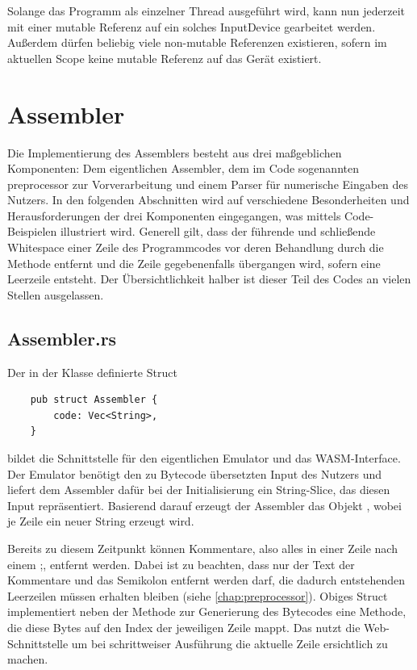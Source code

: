 
Solange das Programm als einzelner Thread ausgeführt wird, kann nun jederzeit mit einer mutable Referenz auf ein solches InputDevice gearbeitet werden. Außerdem dürfen beliebig viele non-mutable Referenzen existieren, sofern im aktuellen Scope keine mutable Referenz auf das Gerät existiert.

\section{Assembler}

Die Implementierung des Assemblers besteht aus drei maßgeblichen Komponenten: Dem eigentlichen Assembler, dem im Code sogenannten \glqq preprocessor\grqq{} zur Vorverarbeitung und einem Parser für numerische Eingaben des Nutzers. In den folgenden Abschnitten wird auf verschiedene Besonderheiten und Herausforderungen der drei Komponenten eingegangen, was mittels Code-Beispielen illustriert wird. Generell gilt, dass der führende und schließende Whitespace einer Zeile des Programmcodes vor deren Behandlung durch die Methode  entfernt und die Zeile gegebenenfalls übergangen wird, sofern eine Leerzeile entsteht. Der Übersichtlichkeit halber ist dieser Teil des Codes an vielen Stellen ausgelassen.

\subsection{Assembler.rs}

Der in der Klasse  definierte Struct 
\begin{verbatim}
    pub struct Assembler {
        code: Vec<String>,
    }
\end{verbatim}
bildet die Schnittstelle für den eigentlichen Emulator und das \ac{WASM}-Interface. Der Emulator benötigt den zu Bytecode übersetzten Input des Nutzers und liefert dem Assembler dafür bei der Initialisierung ein String-Slice, das diesen Input repräsentiert. Basierend darauf erzeugt der Assembler das Objekt , wobei je Zeile ein neuer String erzeugt wird. 

Bereits zu diesem Zeitpunkt können Kommentare, also alles in einer Zeile nach einem \glqq ;\grqq, entfernt werden. Dabei ist zu beachten, dass nur der Text der Kommentare und das Semikolon entfernt werden darf, die dadurch entstehenden Leerzeilen müssen erhalten bleiben (siehe \ref{chap:preprocessor}). Obiges Struct implementiert neben der Methode  zur Generierung des Bytecodes eine Methode, die diese Bytes auf den Index der jeweiligen Zeile mappt. Das nutzt die Web-Schnittstelle um bei schrittweiser Ausführung die aktuelle Zeile ersichtlich zu machen.


